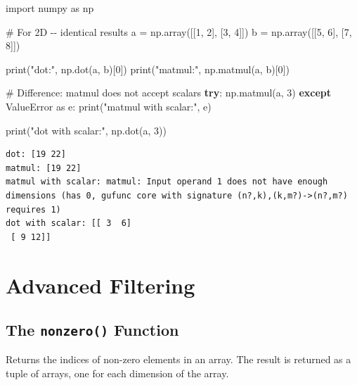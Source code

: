 \documentclass[
  english,
  letterpaper,
  DIV=11,
  numbers=noendperiod]{scrreprt}
\newenvironment{Shaded}{\begin{snugshade}}{\end{snugshade}}
\newcommand{\BuiltInTok}[1]{\textcolor[rgb]{0.00,0.23,0.31}{#1}}
\newcommand{\CommentTok}[1]{\textcolor[rgb]{0.37,0.37,0.37}{#1}}
\newcommand{\ControlFlowTok}[1]{\textcolor[rgb]{0.00,0.23,0.31}{\textbf{#1}}}
\newcommand{\DecValTok}[1]{\textcolor[rgb]{0.68,0.00,0.00}{#1}}
\newcommand{\ImportTok}[1]{\textcolor[rgb]{0.00,0.46,0.62}{#1}}
\newcommand{\NormalTok}[1]{\textcolor[rgb]{0.00,0.23,0.31}{#1}}
\newcommand{\OperatorTok}[1]{\textcolor[rgb]{0.37,0.37,0.37}{#1}}
\newcommand{\PreprocessorTok}[1]{\textcolor[rgb]{0.68,0.00,0.00}{#1}}
\newcommand{\StringTok}[1]{\textcolor[rgb]{0.13,0.47,0.30}{#1}}
\begin{document}
\begin{Shaded}
\begin{Highlighting}[]
\ImportTok{import}\NormalTok{ numpy }\ImportTok{as}\NormalTok{ np}

\CommentTok{\# For 2D {-}{-} identical results}
\NormalTok{a }\OperatorTok{=}\NormalTok{ np.array([[}\DecValTok{1}\NormalTok{, }\DecValTok{2}\NormalTok{], [}\DecValTok{3}\NormalTok{, }\DecValTok{4}\NormalTok{]])}
\NormalTok{b }\OperatorTok{=}\NormalTok{ np.array([[}\DecValTok{5}\NormalTok{, }\DecValTok{6}\NormalTok{], [}\DecValTok{7}\NormalTok{, }\DecValTok{8}\NormalTok{]])}

\BuiltInTok{print}\NormalTok{(}\StringTok{"dot:"}\NormalTok{, np.dot(a, b)[}\DecValTok{0}\NormalTok{])}
\BuiltInTok{print}\NormalTok{(}\StringTok{"matmul:"}\NormalTok{, np.matmul(a, b)[}\DecValTok{0}\NormalTok{])}

\CommentTok{\# Difference: matmul does not accept scalars}
\ControlFlowTok{try}\NormalTok{:}
\NormalTok{    np.matmul(a, }\DecValTok{3}\NormalTok{)}
\ControlFlowTok{except} \PreprocessorTok{ValueError} \ImportTok{as}\NormalTok{ e:}
    \BuiltInTok{print}\NormalTok{(}\StringTok{"matmul with scalar:"}\NormalTok{, e)}

\BuiltInTok{print}\NormalTok{(}\StringTok{"dot with scalar:"}\NormalTok{, np.dot(a, }\DecValTok{3}\NormalTok{))}
\end{Highlighting}
\end{Shaded}

\begin{verbatim}
dot: [19 22]
matmul: [19 22]
matmul with scalar: matmul: Input operand 1 does not have enough dimensions (has 0, gufunc core with signature (n?,k),(k,m?)->(n?,m?) requires 1)
dot with scalar: [[ 3  6]
 [ 9 12]]
\end{verbatim}

\chapter{Advanced Filtering}\label{advanced-filtering}

\section{\texorpdfstring{The \texttt{nonzero()}
Function}{The nonzero() Function}}\label{the-nonzero-function}

Returns the indices of non-zero elements in an array. The result is
returned as a tuple of arrays, one for each dimension of the array.
\end{document}
